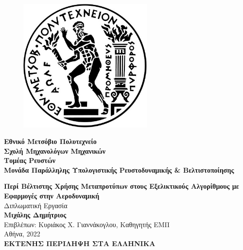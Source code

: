 \documentclass[twoside, 12pt,notitlepage]{report}
\begin{document}
\clearpage
{}
\setcounter{page}{1}
\newpage

\begin{figure}
\includegraphics[width=0.6\textwidth]{NTUA}
\end{figure}

\hspace{-8mm}
\textbf{Eθνικό Μετσόβιο Πολυτεχνείο} \\
\textbf{Σχολή Μηχανολόγων Μηχανικών} \\
\textbf{Τομέας Ρευστών} \\
\textbf{Μονάδα Παράλληλης Υπολογιστικής Ρευστοδυναμικής \& 
Βελτιστοποίησης} \\

\hspace{-2mm}
\begin{center}
\textbf{Περί Βέλτιστης Χρήσης Μεταπροτύπων στους Εξελικτικούς 
Αλγορίθμους με Εφαρμογές στην Αεροδυναμική} \\[3mm]
Διπλωματική Εργασία \\[1mm]
\textbf{Μιχάλης Δημήτριος} \\[3mm]
Επιβλέπων: Kυριάκος Χ. Γιαννάκογλου, Καθηγητής ΕΜΠ \\[1mm]
Αθήνα, 2022 \\[6mm]
\large \textbf{ΕΚΤΕΝΗΣ ΠΕΡΙΛΗΨΗ ΣΤΑ ΕΛΛΗΝΙΚΑ} \\
\end{center}

\vfill 
\end{document}
